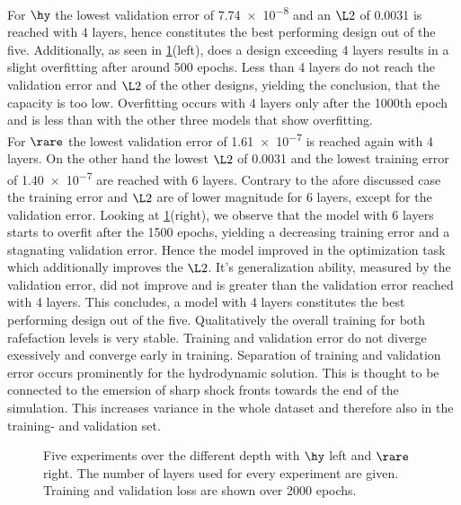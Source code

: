 For \(\hy\) the lowest validation error of \num{7.74e-8} and an \(\L2\) of 0.0031 is reached with 4 layers, hence constitutes the best performing design out of the five. Additionally, as seen in \cref{Fig:Depth}(left), does a design exceeding 4 layers results in a slight overfitting after around 500 epochs. Less than 4 layers do not reach the validation error and \(\L2\) of the other designs, yielding the conclusion, that the capacity is too low. Overfitting occurs with 4 layers only after the 1000th epoch and is less than with the other three models that show overfitting.\\
For \(\rare\) the lowest validation error of \num{1.61e-7} is reached again with 4 layers. On the other hand the lowest \(\L2\) of 0.0031 and the lowest training error of \num{1.40e-7} are reached with 6 layers. Contrary to the afore discussed case the training error and \(\L2\) are of lower magnitude for 6 layers, except for the validation error. Looking at \cref{Fig:Depth}(right), we observe that the model with 6 layers starts to overfit after the 1500 epochs, yielding a decreasing training error and a stagnating validation error. Hence the model improved in the optimization task which additionally improves the \(\L2\). It's generalization ability, measured by the validation error, did not improve and is greater than the validation error reached with 4 layers. This concludes, a model with 4 layers constitutes the best performing design out of the five.
Qualitatively the overall training for both rafefaction levels is very stable. Training and validation error do not diverge exessively and converge early in training. Separation of training and validation error occurs prominently for the hydrodynamic solution. This is thought to be connected to the emersion of sharp shock fronts towards the end of the simulation. This increases variance in the whole dataset and therefore also in the training- and validation set.
\begin{center}
	\begin{figure}[H]
		\hfill
		
		\hfill
		
		\hfill
		
		\hfill
		
		\hfill
		
		\caption{Five experiments over the different depth with $\hy$ left and $\rare$ right. The number of layers used for every experiment are given. Training and validation loss are shown over 2000 epochs.}
		\label{Fig:Depth}
	\end{figure}
\end{center}
